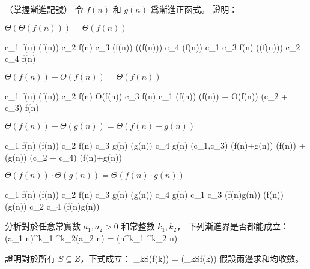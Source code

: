 \stopigBase
\stopPROBLEM

\startPROBLEM
（掌握漸進記號）
令 $f(n)$ 和 $g(n)$ 爲漸進正函式。
證明：
\startigBase[a]

\startitem
$\Theta(\Theta(f(n))) = \Theta(f(n))$

\startANSWER
\startformula\startmathalignment[n=3]
\NC c_1 f(n) \le \NC \Theta(f(n)) \NC \le c_2 f(n) \NR
\NC c_3 \Theta(f(n)) \le \NC \Theta(\Theta(f(n))) \NC \le c_4 \Theta(f(n)) \NR
\NC c_1 c_3 f(n) \le \NC \Theta(\Theta(f(n))) \NC \le c_2 c_4 f(n) \NR
\stopmathalignment\stopformula
\stopANSWER
\stopitem

\startitem
$\Theta(f(n)) + O(f(n)) = \Theta(f(n))$

\startANSWER
\startformula\startmathalignment[n=3]
\NC c_1 f(n) \le \NC \Theta(f(n)) \NC \le c_2 f(n) \NR
\NC \NC O(f(n)) \NC \le c_3 f(n) \NR
\NC c_1 \Theta(f(n)) \le \NC \Theta(f(n)) + O(f(n)) \NC \le (c_2 + c_3) f(n) \NR
\stopmathalignment\stopformula
\stopANSWER
\stopitem

\startitem
$\Theta(f(n)) + \Theta(g(n)) = \Theta(f(n)+g(n))$

\startANSWER
\startformula\startmathalignment[n=3]
\NC c_1 f(n) \le \NC \Theta(f(n)) \NC \le c_2 f(n) \NR
\NC c_3 g(n) \le \NC \Theta(g(n)) \NC \le c_4 g(n) \NR
\NC \min(c_1,c_3) (f(n)+g(n)) \le
	 \NC \Theta(f(n)) + \Theta(g(n))
	 \NC \le \max(c_2 + c_4) (f(n)+g(n)) \NR
\stopmathalignment\stopformula
\stopANSWER
\stopitem

\startitem
$\Theta(f(n)) \cdot \Theta(g(n)) = \Theta(f(n) \cdot g(n))$

\startANSWER
\startformula\startmathalignment[n=3]
\NC c_1 f(n) \le \NC \Theta(f(n)) \NC \le c_2 f(n) \NR
\NC c_3 g(n) \le \NC \Theta(g(n)) \NC \le c_4 g(n) \NR
\NC c_1 c_3 (f(n)\cdot g(n)) \le
	 \NC \Theta(f(n)) \cdot \Theta(g(n))
	 \NC \le c_2 c_4 (f(n)\cdot g(n)) \NR
\stopmathalignment\stopformula
\stopANSWER
\stopitem

\startitem
分析對於任意常實數 $a_1,a_2 > 0$ 和常整數 $k_1,k_2$，
下列漸進界是否都能成立：
\startformula
(a_1 n)^{k_1} \lg^{k_2}(a_2 n) = \Theta(n^{k_1} \lg^{k_2} n)
\stopformula

\startANSWER
{}
\stopANSWER
\stopitem

\startitem
證明對於所有 $S\subseteq Z$，下式成立：
\startformula
\sum_{k\in S}\Theta(f(k)) = \Theta(\sum_{k\in S}f(k))
\stopformula
假設兩邊求和均收斂。

\startANSWER
{}
\stopANSWER
\stopitem


